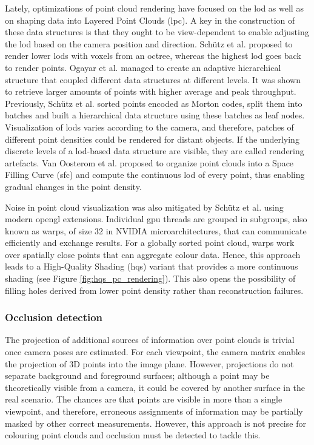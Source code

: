 Lately, optimizations of point cloud rendering have focused on the \acrshort{lod} as well as on shaping data into Layered Point Clouds (\acrshort{lpc}). A key in the construction of these data structures is that they ought to be view-dependent to enable adjusting the \acrshort{lod} based on the camera position and direction. Schütz et al. \cite{schutz_gpu-accelerated_2023} proposed to render lower \acrshort{lod}s with voxels from an octree, whereas the highest \acrshort{lod} goes back to render points. Ogayar et al. \cite{ogayar-anguita_nested_2023} managed to create an adaptive hierarchical structure that coupled different data structures at different levels. It was shown to retrieve larger amounts of points with higher average and peak throughput. Previously, Schütz et al. \cite{schutz_software_2022} sorted points encoded as Morton codes, split them into batches and built a hierarchical data structure using these batches as leaf nodes. Visualization of \acrshort{lod}s varies according to the camera, and therefore, patches of different point densities could be rendered for distant objects. If the underlying discrete levels of a \acrshort{lod}-based data structure are visible, they are called rendering artefacts. Van Oosterom et al. \cite{van_oosterom_organizing_2022} proposed to organize point clouds into a Space Filling Curve (\acrshort{sfc}) and compute the continuous \acrshort{lod} of every point, thus enabling gradual changes in the point density. 

Noise in point cloud visualization was also mitigated by Schütz et al. \cite{schutz_rendering_2019, schutz_rendering_2021} using modern \acrshort{opengl} extensions. Individual \acrshort{gpu} threads are grouped in subgroups, also known as warps, of size 32 in NVIDIA microarchitectures, that can communicate efficiently and exchange results. For a globally sorted point cloud, warps work over spatially close points that can aggregate colour data. Hence, this approach leads to a High-Quality Shading (\acrshort{hqs}) variant \cite{schutz_rendering_2021} that provides a more continuous shading (see Figure \ref{fig:hqs_pc_rendering}). This also opens the possibility of filling holes derived from lower point density rather than reconstruction failures. 

\subsubsection{Occlusion detection}

The projection of additional sources of information over point clouds is trivial once camera poses are estimated. For each viewpoint, the camera matrix enables the projection of 3D points into the image plane. However, projections do not separate background and foreground surfaces; although a point may be theoretically visible from a camera, it could be covered by another surface in the real scenario. The chances are that points are visible in more than a single viewpoint, and therefore, erroneous assignments of information may be partially masked by other correct measurements. However, this approach is not precise for colouring point clouds and occlusion must be detected to tackle this.    


